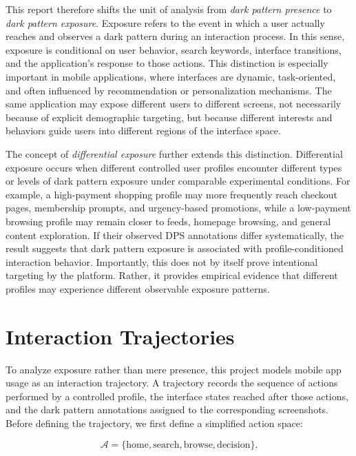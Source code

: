 This report therefore shifts the unit of analysis from \emph{dark pattern presence} to \emph{dark pattern exposure}. Exposure refers to the event in which a user actually reaches and observes a dark pattern during an interaction process. In this sense, exposure is conditional on user behavior, search keywords, interface transitions, and the application's response to those actions. This distinction is especially important in mobile applications, where interfaces are dynamic, task-oriented, and often influenced by recommendation or personalization mechanisms. The same application may expose different users to different screens, not necessarily because of explicit demographic targeting, but because different interests and behaviors guide users into different regions of the interface space.

The concept of \emph{differential exposure} further extends this distinction. Differential exposure occurs when different controlled user profiles encounter different types or levels of dark pattern exposure under comparable experimental conditions. For example, a high-payment shopping profile may more frequently reach checkout pages, membership prompts, and urgency-based promotions, while a low-payment browsing profile may remain closer to feeds, homepage browsing, and general content exploration. If their observed DPS annotations differ systematically, the result suggests that dark pattern exposure is associated with profile-conditioned interaction behavior. Importantly, this does not by itself prove intentional targeting by the platform. Rather, it provides empirical evidence that different profiles may experience different observable exposure patterns.

\section{Interaction Trajectories}
\label{subsec:interaction-trajectories}

To analyze exposure rather than mere presence, this project models mobile app usage as an interaction trajectory. A trajectory records the sequence of actions performed by a controlled profile, the interface states reached after those actions, and the dark pattern annotations assigned to the corresponding screenshots. Before defining the trajectory, we first define a simplified action space:

\begin{equation}
\mathcal{A}
=
\{\mathrm{home}, \mathrm{search}, \mathrm{browse}, \mathrm{decision}\}.
\label{eq:action-space}
\end{equation}

